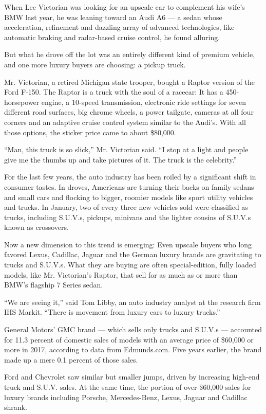 When Lee Victorian was looking for an upscale car to complement his
wife's BMW last year, he was leaning toward an Audi A6 --- a sedan whose
acceleration, refinement and dazzling array of advanced technologies,
like automatic braking and radar-based cruise control, he found
alluring.

But what he drove off the lot was an entirely different kind of premium
vehicle, and one more luxury buyers are choosing: a pickup truck.

Mr. Victorian, a retired Michigan state trooper, bought a Raptor version
of the Ford F-150. The Raptor is a truck with the soul of a racecar: It
has a 450-horsepower engine, a 10-speed transmission, electronic ride
settings for seven different road surfaces, big chrome wheels, a power
tailgate, cameras at all four corners and an adaptive cruise control
system similar to the Audi's. With all those options, the sticker price
came to about \$80,000.

``Man, this truck is so slick,'' Mr. Victorian said. ``I stop at a light
and people give me the thumbs up and take pictures of it. The truck is
the celebrity.''

For the last few years, the auto industry has been roiled by a
significant shift in consumer tastes. In droves, Americans are turning
their backs on family sedans and small cars and flocking to bigger,
roomier models like sport utility vehicles and trucks. In January, two
of every three new vehicles sold were classified as trucks, including
S.U.V.s, pickups, minivans and the lighter cousins of S.U.V.s known as
crossovers.

Now a new dimension to this trend is emerging: Even upscale buyers who
long favored Lexus, Cadillac, Jaguar and the German luxury brands are
gravitating to trucks and S.U.V.s. What they are buying are often
special-edition, fully loaded models, like Mr. Victorian's Raptor, that
sell for as much as or more than BMW's flagship 7 Series sedan.

``We are seeing it,'' said Tom Libby, an auto industry analyst at the
research firm IHS Markit. ``There is movement from luxury cars to luxury
trucks.''

General Motors' GMC brand --- which sells only trucks and S.U.V.s ---
accounted for 11.3 percent of domestic sales of models with an average
price of \$60,000 or more in 2017, according to data from Edmunds.com.
Five years earlier, the brand made up a mere 0.1 percent of those sales.

Ford and Chevrolet saw similar but smaller jumps, driven by increasing
high-end truck and S.U.V. sales. At the same time, the portion of
over-\$60,000 sales for luxury brands including Porsche, Mercedes-Benz,
Lexus, Jaguar and Cadillac shrank.

